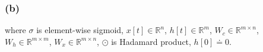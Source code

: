 

\subsubsection*{(b)}
where $\sigma$ is element-wise sigmoid, $x[t] \in \mathbb{R}^n$, $h[t] \in \mathbb{R}^m$, $W_c \in \mathbb{R}^{m \times n}$,  $W_h \in \mathbb{R}^{m \times m}$, $W_x \in \mathbb{R}^{m \times n}$, $\odot$ is Hadamard product, $h[0] \doteq 0$.

